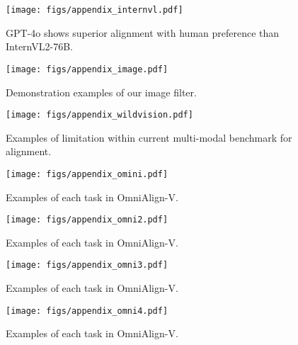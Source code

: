 \begin{figure*}[t]
    \centering
    \texttt{[image: figs/appendix\_internvl.pdf]}
    \caption{GPT-4o shows superior alignment with human preference than InternVL2-76B.}
    \label{fig:internvl}
\end{figure*}
\begin{figure*}[t]
    \centering
    \texttt{[image: figs/appendix\_image.pdf]}
    \caption{Demonstration examples of our image filter.}
    \label{fig:imagefilter}
\end{figure*}
\begin{figure*}[t]
    \centering
    \texttt{[image: figs/appendix\_wildvision.pdf]}
    \caption{Examples of limitation within current multi-modal benchmark for alignment.}
    \label{fig:badbench}
\end{figure*}
\begin{figure*}[t]
    \centering
    \texttt{[image: figs/appendix\_omini.pdf]}
    \caption{Examples of each task in OmniAlign-V.}
    \label{fig:datasample1}
\end{figure*}
\begin{figure*}[t]
    \centering
    \texttt{[image: figs/appendix\_omni2.pdf]}
    \caption{Examples of each task in OmniAlign-V.}
    \label{fig:datasample2}
\end{figure*}
\begin{figure*}[t]
    \centering
    \texttt{[image: figs/appendix\_omni3.pdf]}
    \caption{Examples of each task in OmniAlign-V.}
    \label{fig:datasample3}
\end{figure*}
\begin{figure*}[t]
    \centering
    \texttt{[image: figs/appendix\_omni4.pdf]}
    \caption{Examples of each task in OmniAlign-V.}
    \label{fig:datasample4}
\end{figure*}


